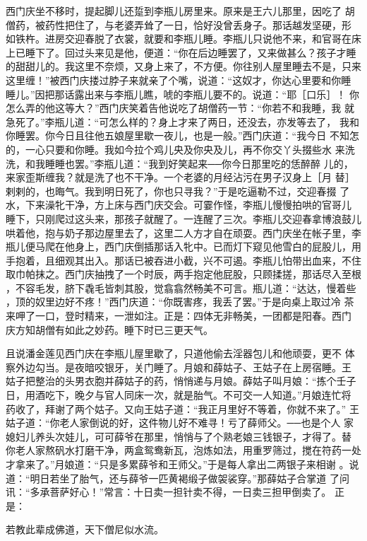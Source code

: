 西门庆坐不移时，提起脚儿还踅到李瓶儿房里来。原来是王六儿那里，因吃了
胡僧药，被药性把住了，与老婆弄耸了一日，恰好没曾丢身子。那话越发坚硬，形
如铁杵。进房交迎春脱了衣裳，就要和李瓶儿睡。李瓶儿只说他不来，和官哥在床
上已睡下了。回过头来见是他，便道：“你在后边睡罢了，又来做甚么？孩子才睡
的甜甜儿的。我这里不奈烦，又身上来了，不方便。你往别人屋里睡去不是，只来
这里缠！”被西门庆搂过脖子来就亲了个嘴，说道：“这奴才，你达心里要和你睡
睡儿。”因把那话露出来与李瓶儿瞧，唬的李瓶儿要不的。说道：“耶［口乐］！
你怎么弄的他这等大？”西门庆笑着告他说吃了胡僧药一节：“你若不和我睡，我
就急死了。”李瓶儿道：“可怎么样的？身上才来了两日，还没去，亦发等去了，
我和你睡罢。你今日且往他五娘屋里歇一夜儿，也是一般。”西门庆道：“我今日
不知怎的，一心只要和你睡。我如今拉个鸡儿央及你央及儿，再不你交丫头掇些水
来洗洗，和我睡睡也罢。”李瓶儿道：“我到好笑起来──你今日那里吃的恁醉醉
儿的，来家歪斯缠我？就是洗了也不干净。一个老婆的月经沾污在男子汉身上［月
替］剌剌的，也晦气。我到明日死了，你也只寻我？”于是吃逼勒不过，交迎春掇
了水，下来澡牝干净，方上床与西门庆交会。可霎作怪，李瓶儿慢慢拍哄的官哥儿
睡下，只刚爬过这头来，那孩子就醒了。一连醒了三次。李瓶儿交迎春拿博浪鼓儿
哄着他，抱与奶子那边屋里去了，这里二人方才自在顽耍。西门庆坐在帐子里，李
瓶儿便马爬在他身上，西门庆倒插那话入牝中。已而灯下窥见他雪白的屁股儿，用
手抱着，且细观其出入。那话已被吞进小截，兴不可遏。李瓶儿怕带出血来，不住
取巾帕抹之。西门庆抽拽了一个时辰，两手抱定他屁股，只顾揉搓，那话尽入至根
，不容毛发，脐下毳毛皆刺其股，觉翕翕然畅美不可言。瓶儿道：“达达，慢着些
，顶的奴里边好不疼！”西门庆道：“你既害疼，我丢了罢。”于是向桌上取过冷
茶来呷了一口，登时精来，一泄如注。正是：四体无非畅美，一团都是阳春。西门
庆方知胡僧有如此之妙药。睡下时已三更天气。

且说潘金莲见西门庆在李瓶儿屋里歇了，只道他偷去淫器包儿和他顽耍，更不
体察外边勾当。是夜暗咬银牙，关门睡了。月娘和薛姑子、王姑子在上房宿睡。王
姑子把整治的头男衣胞并薛姑子的药，悄悄递与月娘。薛姑子叫月娘：“拣个壬子
日，用酒吃下，晚夕与官人同床一次，就是胎气。不可交一人知道。”月娘连忙将
药收了，拜谢了两个姑子。又向王姑子道：“我正月里好不等着，你就不来了。”
王姑子道：“你老人家倒说的好，这件物儿好不难寻！亏了薛师父。──也是个人
家媳妇儿养头次娃儿，可可薛爷在那里，悄悄与了个熟老娘三钱银子，才得了。替
你老人家熬矾水打磨干净，两盒鸳鸯新瓦，泡炼如法，用重罗筛过，搅在符药一处
才拿来了。”月娘道：“只是多累薛爷和王师父。”于是每人拿出二两银子来相谢
。说道：“明日若坐了胎气，还与薛爷一匹黄褐缎子做袈裟穿。”那薛姑子合掌道
了问讯：“多承菩萨好心！”常言：十日卖一担针卖不得，一日卖三担甲倒卖了。
正是：

若教此辈成佛道，天下僧尼似水流。